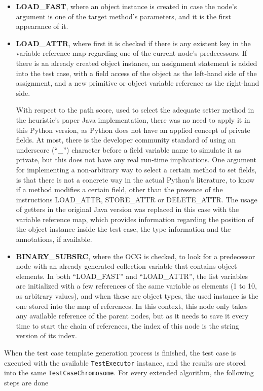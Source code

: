 \documentclass[%
  chapterprefix=false,%
  open=right,%
  twoside=true,%
  paper=a4,%
  logofile={Figures/logo.png},%
  thesistype=master,%
  UKenglish,%
]{se2thesis}
\newcommand{\classname}[1]{\texttt{#1}}
\begin{document}
\begin{itemize}
  \item \textbf{LOAD\_FAST}, where an object instance is created in case the node's argument is one of the target method's parameters, and it is the first appearance of it.
  \item \textbf{LOAD\_ATTR}, where first it is checked if there is any existent key in the variable reference map regarding one of the current node's predecessors. If there is an already created object instance, an assignment statement is added into the test case, with a field access of the object as the left-hand side of the assignment, and a new primitive or object variable reference as the right-hand side.
  
  With respect to the path score, used to select the adequate setter method in the heuristic's paper Java implementation, there was no need to apply it in this Python version, as Python does not have an applied concept of private fields.
  At most, there is the developer community standard of using an underscore (``\_'') character before a field variable name to simulate it as private, but this does not have any real run-time implications.
  One argument for implementing a non-arbitrary way to select a certain method to set fields, is that there is not a concrete way in the actual Python's literature, to know if a method modifies a certain field, other than the presence of the instructions LOAD\_ATTR, STORE\_ATTR or DELETE\_ATTR.\@
  The usage of getters in the original Java version was replaced in this case with the variable reference map, which provides information regarding the position of the object instance inside the test case, the type information and the annotations, if available.

  \item \textbf{BINARY\_SUBSRC}, where the OCG is checked, to look for a predecessor node with an already generated collection variable that contains object elements. In both ``LOAD\_FAST'' and ``LOAD\_ATTR'', the list variables are initialized with a few references of the same variable as elements (1 to 10, as arbitrary values), and when these are object types, the used instance is the one stored into the map of references.
  In this context, this node only takes any available reference of the parent nodes, but as it needs to save it every time to start the chain of references, the index of this node is the string version of its index.
\end{itemize}

When the test case template generation process is finished, the test case is executed with the available \classname{TestExecutor} instance, and the results are stored into the same \classname{TestCaseChromosome}.
For every extended algorithm, the following steps are done
\end{document}
